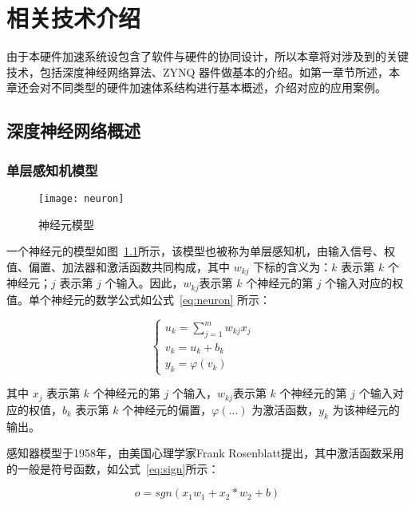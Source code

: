 \chapter{相关技术介绍}\label{chap:introduction}

由于本硬件加速系统设包含了软件与硬件的协同设计，所以本章将对涉及到的关键技术，包括深度神经网络算法、ZYNQ 器件做基本的介绍。如第一章节所述，本章还会对不同类型的硬件加速体系结构进行基本概述，介绍对应的应用案例。


\section{深度神经网络概述}

\subsection{单层感知机模型}

\begin{figure}[!htbp]
    \centering
    \texttt{[image: neuron]}
    \caption{神经元模型}
    \label{fig:neuron}
\end{figure}

一个神经元的模型如图~\ref{fig:neuron}所示，该模型也被称为单层感知机，由输入信号、权值、偏置、加法器和激活函数共同构成，其中 $w_{kj}$ 下标的含义为：$k$ 表示第 $k$ 个神经元；$j$ 表示第 $j$ 个输入。因此，$w_{kj}$表示第 $k$ 个神经元的第 $j$ 个输入对应的权值。单个神经元的数学公式如公式~\eqref{eq:neuron} 所示：

\begin{equation} \label{eq:neuron}
\begin{cases}
u_k = \sum_{j=1}^{m} w_{kj}x_j & \\
v_k = u_k + b_k & \\
y_k = \varphi(v_k) &
\end{cases}
\end{equation}

其中 $x_j$ 表示第 $k$ 个神经元的第 $j$ 个输入，$w_{kj}$表示第 $k$ 个神经元的第 $j$ 个输入对应的权值，$b_k$ 表示第 $k$ 个神经元的偏置，$\varphi(\dots)$ 为激活函数，$y_k$ 为该神经元的输出。

感知器模型于1958年，由美国心理学家Frank Rosenblatt提出，其中激活函数采用的一般是符号函数，如公式~\eqref{eq:sign}所示：

\begin{equation} \label{eq:sign}
    o = sgn(x_1w_1+x_2*w_2+b)
\end{equation}

